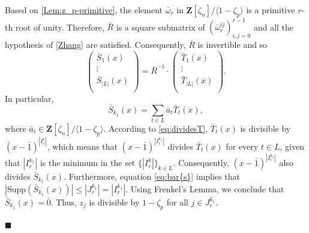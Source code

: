\documentclass[a4paper,12pt,reqno]{amsart}
\newenvironment{proofofB}{{\bf {Proof of Theorem \ref{Thm:B}.} }}{\hfill $\blacksquare$ \\}
\def\Z{\mathbf{Z}}
\def\Supp{\mathrm{Supp}}
\begin{document}
\begin{proofofB}
Based on \autoref{Lem:z_p-primitive}, the element $\bar{\omega}_r$ in $\Z[\zeta_n]/\langle 1- \zeta_p \rangle $ is a primitive $r$-th root of unity. Therefore, $\bar{R}$ is a square submatrix of $(\bar{\omega}_r^{ij})_{i,j = 0}^{r-1}$ and all the  hypothesis of \autoref{Zhang} are satisfied. Consequently, $\bar{R}$ is invertible and so 
\begin{equation*}
   \left( \begin{matrix}
    \bar{S}_1(x)\\
    \vdots\\
    \bar{S}_{|L|}(x)\\
\end{matrix}
\right)
= \bar{R}^{-1} \cdot  \left( \begin{matrix}
    \bar{T}_1(x)\\
    \vdots\\
    \bar{T}_{|L|}(x)\\
\end{matrix}
\right). 
\end{equation*}
In particular, 
\begin{equation}\label{eq:S_k1}
\bar{S}_{k_1}(x) = \sum_{t \in L} \bar{a}_t \bar{T}_t(x), 
\end{equation}
where $\bar{a}_t \in \Z[\zeta_n]/ \langle 1- \zeta_p \rangle$.  
According to \eqref{eq:dividesT}, $\bar{T}_t(x)$ is divisible by $(x-\bar{1})^{|I_r^t|}$, which means that $(x-\bar{1})^{|I_r^{k_1}|}$ divides $\bar{T}_t(x)$ for every $t \in L$, given that $|I_r^{k_1}|$ is the minimum in the set $\{ |I_r^k| \}_{k \in L}$. Consequently, $(x-\bar{1})^{|I_r^{k_1}|}$ also divides $\bar{S}_{k_1}(x)$. Furthermore, equation \eqref{eq:bar{s}} implies that $|\Supp(\bar{S}_{k_1}(x))| \leq |J_r^{k_1}| = |I_r^{k_1}|$. Using  Frenkel's Lemma, we conclude that $\bar{S}_{k_1}(x) = \bar{0}$. Thus, $z_j$ is divisible by $1-\zeta_p$ for all $j \in J_r^{k_1}$.


\end{proofofB}
\end{document}
